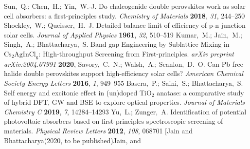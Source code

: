 \documentclass[journal=jpclcd,manuscript=letter]{achemso}
\begin{document}
\begin{mcitethebibliography}{49}
Sun,~Q.; Chen,~H.; Yin,~W.-J. Do chalcogenide double perovskites work as solar
  cell absorbers: a first-principles study. \emph{Chemistry of Materials}
  \textbf{2018}, \emph{31}, 244--250\relax
\mciteBstWouldAddEndPuncttrue
\mciteSetBstMidEndSepPunct{\mcitedefaultmidpunct}
{\mcitedefaultendpunct}{\mcitedefaultseppunct}\relax
\EndOfBibitem
{}
Shockley,~W.; Queisser,~H.~J. Detailed balance limit of efficiency of p-n
  junction solar cells. \emph{Journal of Applied Physics} \textbf{1961},
  \emph{32}, 510--519\relax
\mciteBstWouldAddEndPuncttrue
\mciteSetBstMidEndSepPunct{\mcitedefaultmidpunct}
{\mcitedefaultendpunct}{\mcitedefaultseppunct}\relax
\EndOfBibitem
{}
Kumar,~M.; Jain,~M.; Singh,~A.; Bhattacharya,~S. Band gap Engineering by
  Sublattice Mixing in ${\mathrm{Cs}}_{2}{\mathrm{AgInCl}}_{6}$:
  High-throughput Screening from First-principles. \emph{arXiv preprint
  arXiv:2004.07991} \textbf{2020}, \relax
\mciteBstWouldAddEndPunctfalse
\mciteSetBstMidEndSepPunct{\mcitedefaultmidpunct}
{}{\mcitedefaultseppunct}\relax
\EndOfBibitem
{}
Savory,~C.~N.; Walsh,~A.; Scanlon,~D.~O. Can Pb-free halide double perovskites
  support high-efficiency solar cells? \emph{American Chemical Society Energy
  Letters} \textbf{2016}, \emph{1}, 949--955\relax
\mciteBstWouldAddEndPuncttrue
\mciteSetBstMidEndSepPunct{\mcitedefaultmidpunct}
{\mcitedefaultendpunct}{\mcitedefaultseppunct}\relax
\EndOfBibitem
{}
Basera,~P.; Saini,~S.; Bhattacharya,~S. Self energy and excitonic effect in
  (un)doped ${\mathrm{TiO}}_{2}$ anatase: a comparative study of hybrid DFT, GW
  and BSE to explore optical properties. \emph{Journal of Materials Chemistry
  C} \textbf{2019}, \emph{7}, 14284--14293\relax
\mciteBstWouldAddEndPuncttrue
\mciteSetBstMidEndSepPunct{\mcitedefaultmidpunct}
{\mcitedefaultendpunct}{\mcitedefaultseppunct}\relax
\EndOfBibitem
{}
Yu,~L.; Zunger,~A. Identification of potential photovoltaic absorbers based on
  first-principles spectroscopic screening of materials. \emph{Physical Review
  Letters} \textbf{2012}, \emph{108}, 068701\relax
\mciteBstWouldAddEndPuncttrue
\mciteSetBstMidEndSepPunct{\mcitedefaultmidpunct}
{\mcitedefaultendpunct}{\mcitedefaultseppunct}\relax
\EndOfBibitem
\bibitem[Jain and Bhattacharya(2020, to be published)Jain, and

\end{mcitethebibliography}
\end{document}
